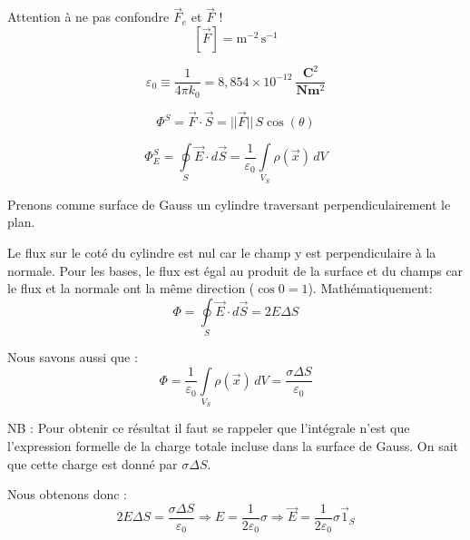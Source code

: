 \documentclass[british,french,11pt, a4paper, openany]{book}
\begin{document}
		Attention à ne pas confondre $\vec F_e$ et $\vec F$ ! $$ [\vec F] = \text{m}^{-2}\,\text{s}^{-1}$$
			
			
		$$ \varepsilon_0 \equiv \dfrac{1}{4\pi k_0} = 8,854 \times 10^{-12}\ \dfrac{\textbf{C}^2}{\textbf{N}\textbf{m}^2}$$
			
			
		$$ \Phi^{S} = \vec F \cdot \vec S = ||\vec F||\,S \cos (\theta)  $$
			
			
		$$ \Phi^S_E = \oint \limits_S \vec E \cdot d \vec S = \dfrac{1}{\varepsilon_0} \int \limits_{V_S} \rho (\vec x) \, dV$$
			
			
		Prenons comme surface de Gauss un cylindre traversant perpendiculairement le plan.
			
		Le flux sur le coté du cylindre est nul car le champ y est perpendiculaire à la normale. Pour les bases, le flux est égal au produit de la surface et du champs car le flux et la normale ont la même direction ($\cos 0 = 1$). Mathématiquement: $$ \Phi = \oint \limits_S \vec E \cdot d \vec S = 2E\Delta S$$
			
		Nous savons aussi que : $$ \Phi =\dfrac{1}{\varepsilon_0} \int \limits_{V_S} \rho (\vec x) \, dV = \dfrac{\sigma \Delta S}{\varepsilon_0}$$
			
		NB : Pour obtenir ce résultat il faut se rappeler que l'intégrale n'est que l'expression formelle de la charge totale incluse dans la surface de Gauss. On sait que cette charge est donné par $\sigma \Delta S$.
			
		Nous obtenons donc : $$ 2E\Delta S = \dfrac{\sigma \Delta S}{\varepsilon_0} \Rightarrow E = \dfrac{1}{2\varepsilon_0}\sigma \Rightarrow \vec E = \dfrac{1}{2\varepsilon_0}\sigma \vec 1_S$$
			
			
\end{document}
